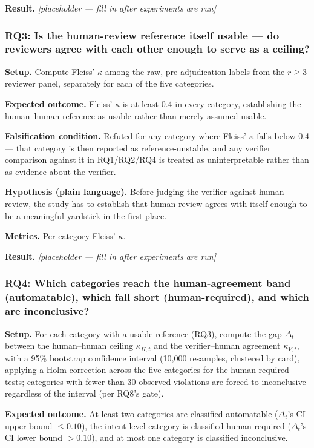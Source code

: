 \documentclass[11pt]{article}
\newcommand{\ph}{\textit{[placeholder --- fill in after experiments are run]}}
\begin{document}
\textbf{Result.} \ph

\subsubsection{RQ3: Is the human-review reference itself usable --- do reviewers agree with each other enough to serve as a ceiling?}
\textbf{Setup.} Compute Fleiss' $\kappa$ among the raw, pre-adjudication labels from the $r \geq 3$-reviewer panel, separately for each of the five categories.

\textbf{Expected outcome.} Fleiss' $\kappa$ is at least 0.4 in every category, establishing the human--human reference as usable rather than merely assumed usable.

\textbf{Falsification condition.} Refuted for any category where Fleiss' $\kappa$ falls below 0.4 --- that category is then reported as reference-unstable, and any verifier comparison against it in RQ1/RQ2/RQ4 is treated as uninterpretable rather than as evidence about the verifier.

\textbf{Hypothesis (plain language).} Before judging the verifier against human review, the study has to establish that human review agrees with itself enough to be a meaningful yardstick in the first place.

\textbf{Metrics.} Per-category Fleiss' $\kappa$.

\textbf{Result.} \ph

\subsubsection{RQ4: Which categories reach the human-agreement band (automatable), which fall short (human-required), and which are inconclusive?}
\textbf{Setup.} For each category with a usable reference (RQ3), compute the gap $\Delta_t$ between the human--human ceiling $\kappa_{H,t}$ and the verifier--human agreement $\kappa_{V,t}$, with a 95\% bootstrap confidence interval (10,000 resamples, clustered by card), applying a Holm correction across the five categories for the human-required tests; categories with fewer than 30 observed violations are forced to inconclusive regardless of the interval (per RQ8's gate).

\textbf{Expected outcome.} At least two categories are classified automatable ($\Delta_t$'s CI upper bound $\leq 0.10$), the intent-level category is classified human-required ($\Delta_t$'s CI lower bound $> 0.10$), and at most one category is classified inconclusive.
\end{document}
